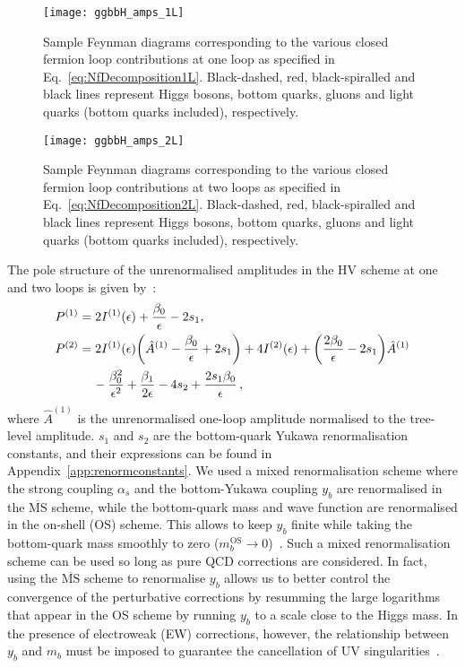 \documentclass[main.tex]{subfiles}
\begin{document}
\begin{figure}[t]
  \begin{center}
    \texttt{[image: ggbbH\_amps\_1L]}
  \end{center}
  \caption{Sample Feynman diagrams corresponding to the various closed fermion loop contributions at one loop as specified in Eq.~\ref{eq:NfDecomposition1L}. 
  Black-dashed, red, black-spiralled and black lines represent Higgs bosons, bottom quarks, gluons and light quarks (bottom quarks included), respectively.}
  \label{fig:amp1L}
\end{figure}

\begin{figure}[t]
  \begin{center}
    \texttt{[image: ggbbH\_amps\_2L]}
  \end{center}
  \caption{Sample Feynman diagrams corresponding to the various closed fermion loop contributions at two loops as specified in Eq.~\ref{eq:NfDecomposition2L}. 
  Black-dashed, red, black-spiralled and black lines represent Higgs bosons, bottom quarks, gluons and light quarks (bottom quarks included), respectively.}
  \label{fig:amp2L}
\end{figure}

The pole structure of the unrenormalised amplitudes in the HV scheme at one and two loops is given by~\cite{Catani:1998bh,Becher:2009qa,Becher:2009cu,Gardi:2009qi}:
\begin{align}
P^{(1)} & = 2 I^{(1)}(\epsilon) + \frac{\beta_0}{\epsilon} - 2 s_1,  
\label{eq:poles1L} \\
P^{(2)} & =   2 I^{(1)}(\epsilon) \bigg( \hat{A}^{(1)} - \frac{\beta_0}{\epsilon} + 2 s_1\bigg) + 4 I^{(2)}(\epsilon)
                + \bigg(\frac{2\beta_0}{\epsilon}-2 s_1\bigg) \hat{A}^{(1)} \nonumber \\  
& \hspace{0.4cm} - \frac{\beta_0^2}{\epsilon^2} + \frac{\beta_1}{2\epsilon} - 4 s_2 + \frac{2 s_1\beta_0}{\epsilon} \,,
\label{eq:poles2L}
\end{align}
where $\hat{A}^{(1)}$ is the unrenormalised one-loop amplitude normalised to the tree-level amplitude.
$s_1$ and $s_2$ are the bottom-quark Yukawa renormalisation constants, and their expressions can be found in Appendix~\ref{app:renormconstants}.
We used a mixed renormalisation scheme where the strong coupling $\alpha_s$ and the bottom-Yukawa coupling $y_b$ are renormalised in the $\overline{\text{MS}}$ scheme, while the bottom-quark mass and wave function are renormalised in the on-shell ($\mathrm{OS}$) scheme. This allows to keep $y_b$ finite while taking the bottom-quark mass smoothly to zero ($m_b^{\mathrm{OS}}\rightarrow 0$)~\cite{Mondini:2021nck}.
Such a mixed renormalisation scheme can be used so long as pure QCD corrections are considered. In fact, using the $\overline{\text{MS}}$ scheme to renormalise $y_b$ allows us to better control the convergence of the perturbative corrections by resumming the large logarithms that appear in the OS scheme by running $y_b$ to a scale close to the Higgs mass. In the presence of electroweak (EW) corrections, however, the relationship between
$y_b$ and $m_b$ must be imposed to guarantee the cancellation of UV singularities~\cite{Pagani:2020rsg}.
\end{document}

